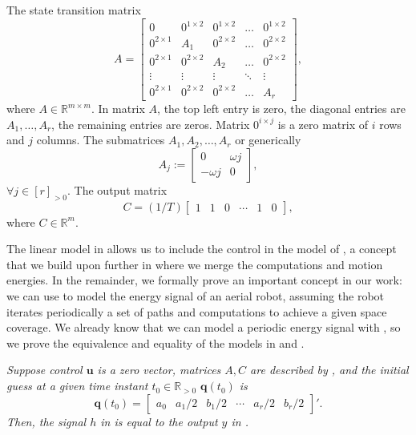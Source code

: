 The state transition matrix
\begin{equation}\label{eq:mat_A}
  A=\left[\begin{array}{ccccc}
    0            & 0^{1\times 2}& 0^{1\times 2}& \dots& 0^{1\times 2} \\
    0^{2\times 1}& A_1          & 0^{2\times 2}& \dots& 0^{2\times 2} \\
    0^{2\times 1}& 0^{2\times 2}& A_2          & \dots& 0^{2\times 2} \\
    \vdots       & \vdots       & \vdots       &\ddots& \vdots        \\
    0^{2\times 1}& 0^{2\times 2}& 0^{2\times 2}& \dots& A_r 
  \end{array}\right],
\end{equation}
where $A\in\mathbb{R}^{m\times m}$. In matrix $A$, the top left entry is zero, the diagonal entries are $A_1,\dots,A_r$, the remaining entries are zeros. Matrix $0^{i\times j}$ is a zero matrix of $i$ rows and $j$ columns. The submatrices $A_1,A_2,\dots,A_r$ or generically
\begin{equation}\label{eq:aj}
  A_j:=\begin{bmatrix}0 & \omega j \\ -\omega j & 0\end{bmatrix},
\end{equation}
$\forall j\in[r]_{>0}$. The output matrix
\begin{equation}\label{eq:mat_C}
  C=(1/T)\left[\begin{array}{cccccc}
    1 & 1 & 0 &\cdots & 1 & 0
  \end{array}\right],
\end{equation}
where $C\in\mathbb{R}^m$.

The linear model in  allows us to include the control in the model of , a concept that we build upon further in  where we merge the computations and motion energies. 
In the remainder, we formally prove an important concept in our work: we can use  to model the energy signal of an aerial robot, assuming the robot iterates periodically a set of paths and computations to achieve a given space coverage. 
We already know that we can model a periodic energy signal with , so we prove the equivalence and equality of the models in  and .

\begin{lem}
  \label{lem:eqv}
  \itshape
  Suppose control $\mathbf{u}$ is a zero vector, matrices $A,C$ are described by , and the initial guess at a given time instant $t_0\in\mathbb{R}_{>0}$ $\mathbf{q}(t_0)$ is 
  \begin{equation*}
    \mathbf{q}(t_0)=\begin{bmatrix}a_0 & a_1/2 & b_1/2 & \cdots & a_r/2 & b_r/2\end{bmatrix}'.
  \end{equation*} 
  Then, the signal $h$ in  is equal to the output $y$ in .
\end{lem}

